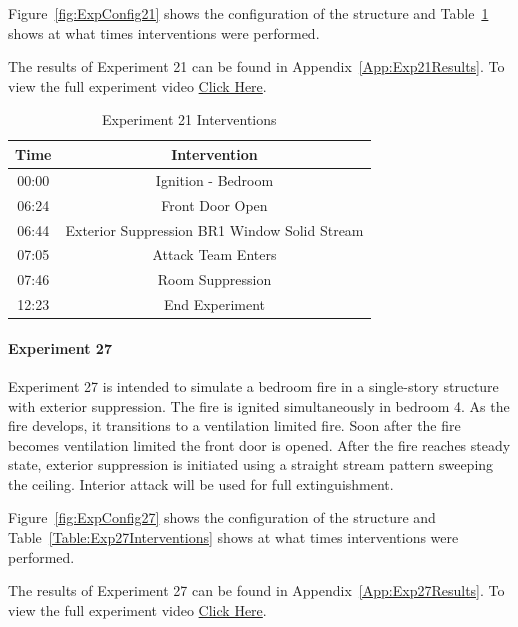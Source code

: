 \documentclass[12pt,oneside]{book}
\begin{document}
Figure~\ref{fig:ExpConfig21} shows the configuration of the structure and Table~\ref{Table:Exp21Interventions} shows at what times interventions were performed. 

The results of Experiment 21 can be found in Appendix~\ref{App:Exp21Results}. To view the full experiment video \href{https://youtu.be/gl8rc1Nsl1k}{Click Here}.

\begin{table}[H]
	\centering
	\caption{Experiment 21 Interventions}
	\begin{tabular}{|c|c|} 
		\hline
		Time & Intervention \\ \hline \hline
		00:00 & Ignition - Bedroom \\ \hline
		06:24 & Front Door Open \\ \hline
		06:44 & Exterior Suppression BR1 Window Solid Stream \\ \hline
		07:05 & Attack Team Enters\\ \hline
		07:46 & Room Suppression \\ \hline 
		12:23 & End Experiment\\ \hline
	\end{tabular}
	\label{Table:Exp21Interventions}
\end{table}

\clearpage

\paragraph{Experiment 27} \mbox{}

Experiment 27 is intended to simulate a bedroom fire in a single-story structure with exterior suppression. The fire is ignited simultaneously in bedroom 4. As the fire develops, it transitions to a ventilation limited fire. Soon after the fire becomes ventilation limited the front door is opened. After the fire reaches steady state, exterior suppression is initiated using a straight stream pattern sweeping the ceiling. Interior attack will be used for full extinguishment. 

Figure~\ref{fig:ExpConfig27} shows the configuration of the structure and Table~\ref{Table:Exp27Interventions} shows at what times interventions were performed. 

The results of Experiment 27 can be found in Appendix~\ref{App:Exp27Results}. To view the full experiment video \href{https://youtu.be/gl8rc1Nsl1k}{Click Here}.
\end{document}
